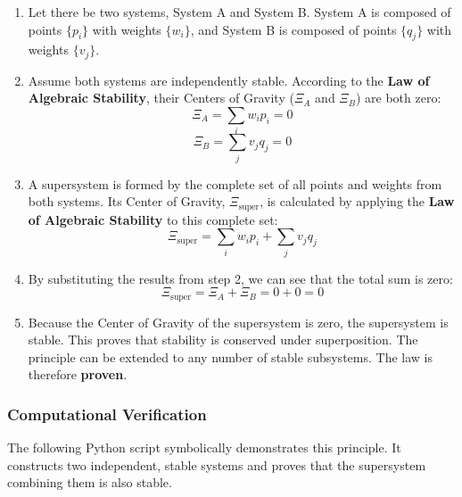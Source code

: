\begin{enumerate}
    \item Let there be two systems, System A and System B. System A is composed of points $\{p_i\}$ with weights $\{w_i\}$, and System B is composed of points $\{q_j\}$ with weights $\{v_j\}$.
    
    \item Assume both systems are independently stable. According to the \textbf{Law of Algebraic Stability}, their Centers of Gravity ($\Xi_A$ and $\Xi_B$) are both zero:
    $$ \Xi_A = \sum_{i} w_i p_i = 0 $$
    $$ \Xi_B = \sum_{j} v_j q_j = 0 $$
    
    \item A supersystem is formed by the complete set of all points and weights from both systems. Its Center of Gravity, $\Xi_{\text{super}}$, is calculated by applying the \textbf{Law of Algebraic Stability} to this complete set:
    $$ \Xi_{\text{super}} = \sum_{i} w_i p_i + \sum_{j} v_j q_j $$
    
    \item By substituting the results from step 2, we can see that the total sum is zero:
    $$ \Xi_{\text{super}} = \Xi_A + \Xi_B = 0 + 0 = 0 $$
    
    \item Because the Center of Gravity of the supersystem is zero, the supersystem is stable. This proves that stability is conserved under superposition. The principle can be extended to any number of stable subsystems. The law is therefore \textbf{proven}.
\end{enumerate}

\subsubsection*{Computational Verification}
The following Python script symbolically demonstrates this principle. It constructs two independent, stable systems and proves that the supersystem combining them is also stable.

